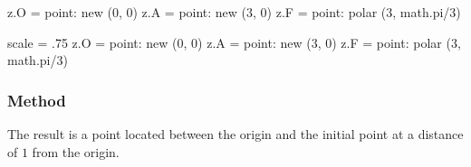 \begin{minipage}{0.6\textwidth}
\begin{tkzexample}[latex=0cm,small,code only]
\begin{tkzelements}
   z.O     = point:   new  (0, 0)
   z.A     = point:   new  (3, 0)
   z.F     = point:   polar (3, math.pi/3)
\end{tkzelements}
\end{tkzexample}
\end{minipage}
\begin{minipage}{0.4\textwidth}
\begin{tkzelements}
    scale   = .75
    z.O     = point:   new  (0, 0)
    z.A     = point:   new  (3, 0)
    z.F     = point:   polar (3, math.pi/3)
\end{tkzelements}
\hspace*{\fill}
\hspace*{\fill}
\end{minipage}

\subsubsection{Method } %
\label{ssub:method_normalize}

The result is a point located between the origin and the initial point at a distance of $1$ from the origin.

